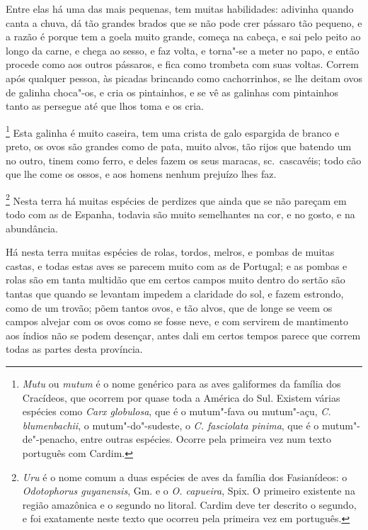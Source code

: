  Entre elas há uma das mais pequenas, tem muitas habilidades: adivinha
quando canta a chuva, dá tão grandes brados que se não pode crer pássaro
tão pequeno, e a razão é porque tem a goela muito grande, começa na
cabeça, e sai pelo peito ao longo da carne, e chega ao sesso, e faz
volta, e torna"-se a meter no papo, e então procede como aos outros
pássaros, e fica como trombeta com suas voltas. Correm após qualquer
pessoa, às picadas brincando como cachorrinhos, se lhe deitam ovos de
galinha choca"-os, e cria os pintainhos, e se vê as galinhas com
pintainhos tanto as persegue até que lhos toma e os cria. 

\footnote{ \textit{Mutu} ou \textit{mutum} é o nome
genérico para as aves galiformes da família dos Cracídeos, que ocorrem
por quase toda a América do Sul. Existem várias espécies como
\textit{Carx globulosa}, que é o mutum"-fava ou mutum"-açu, \textit{C.
blumenbachii}, o mutum"-do"-sudeste, o \textit{C. fasciolata pinima}, que
é o mutum"-de"-penacho, entre outras espécies. Ocorre pela primeira vez
num texto português com Cardim.} Esta galinha é muito
caseira, tem uma crista de galo espargida de branco e preto, os ovos
são grandes como de pata, muito alvos, tão rijos que batendo um no
outro, tinem como ferro, e deles fazem os seus maracas, sc.~cascavéis;
todo cão que lhe come os ossos, e aos homens nenhum prejuízo lhes faz. 

\footnote{ \textit{Uru} é o nome comum a duas espécies
de aves da família dos Fasianídeos: o \textit{Odotophorus guyanensis}, 
Gm. e o \textit{O. capueira}, Spix. O primeiro existente na região
amazônica e o segundo no litoral. Cardim deve ter descrito o segundo, e
foi exatamente neste texto que ocorreu pela primeira vez em
português.} Nesta terra há muitas espécies de perdizes que
ainda que se não pareçam em todo com as de Espanha, todavia são muito
semelhantes na cor, e no gosto, e na abundância. 

 Há nesta terra muitas espécies de rolas, tordos, melros, e pombas de
muitas castas, e todas estas aves se parecem muito com as de Portugal;
e as pombas e rolas são em tanta multidão que em certos campos muito
dentro do sertão são tantas que quando se levantam impedem a claridade
do sol, e fazem estrondo, como de um trovão; põem tantos ovos, e tão
alvos, que de longe se veem os campos alvejar com os ovos como se fosse
neve, e com servirem de mantimento aos índios não se podem desençar,
antes dali em certos tempos parece que correm todas as partes desta província. 

